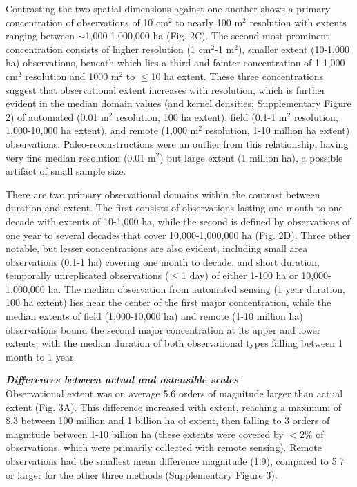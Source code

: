 \documentclass[12pt]{article}
\begin{document}
Contrasting the two spatial dimensions against one another shows a primary concentration of observations of 10 cm$^2$ to nearly 100 m$^2$ resolution with extents ranging between $\sim$1,000-1,000,000 ha (Fig. 2C). The second-most prominent concentration consists of higher resolution (1 cm$^2$-1 m$^2$), smaller extent (10-1,000 ha) observations, beneath which lies a third and fainter concentration of 1-1,000 cm$^2$ resolution and 1000 m$^2$ to $\leq$10 ha extent. These three concentrations suggest that observational extent increases with resolution, which is further evident in the median domain values (and kernel densities; Supplementary Figure 2) of automated (0.01 m$^2$ resolution, 100 ha extent), field (0.1-1 m$^2$ resolution, 1,000-10,000 ha extent), and remote (1,000 m$^2$ resolution, 1-10 million ha extent) observations.  Paleo-reconstructions were an outlier from this relationship, having very fine median resolution (0.01 m$^2$) but large extent (1 million ha), a possible artifact of small sample size. 

There are two primary observational domains within the contrast between duration and extent. The first consists of observations lasting one month to one decade with extents of 10-1,000 ha, while the second is defined by observations of one year to several decades that cover 10,000-1,000,000 ha (Fig. 2D).  Three other notable, but lesser concentrations are also evident, including small area observations (0.1-1 ha) covering one month to decade, and short duration, temporally unreplicated observations ($\leq$1 day) of either 1-100 ha or 10,000-1,000,000 ha.  The median observation from automated sensing (1 year duration, 100 ha extent) lies near the center of the first major concentration, while the median extents of field (1,000-10,000 ha) and remote (1-10 million ha) observations bound the second major concentration at its upper and lower extents, with the median duration of both observational types falling between 1 month to 1 year. 

\vspace{5pt}
\noindent \textbf{\emph{Differences between actual and ostensible scales}}\\
Observational extent was on average 5.6 orders of magnitude larger than actual extent (Fig. 3A). This difference increased with extent, reaching a maximum of 8.3 between 100 million and 1 billion ha of extent, then falling to 3 orders of magnitude between 1-10 billion ha (these extents were covered by $<$2\% of observations, which were primarily collected with remote sensing). Remote observations had the smallest mean difference magnitude (1.9), compared to 5.7 or larger for the other three methods (Supplementary Figure 3). 
\end{document}
